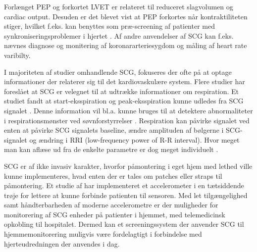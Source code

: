 Forlænget PEP og forkortet LVET er relateret til reduceret slagvolumen og cardiac output. Desuden er det blevet vist at PEP forkortes når kontraktiliteten stiger, hvilket f.eks. kan benyttes som præ-screening af patienter med synkroniseringsproblemer i hjertet  \cite{zanetti}  \cite{abra}. Af andre anvendelser af SCG kan f.eks. nævnes diagnose og monitering af koronararteriesygdom og måling af heart rate varibilty.

I majoriteten af studier omhandlende SCG, fokuseres der ofte på at optage informationer der relaterer sig til det kardiovaskulære system. Flere studier har foreslået at SCG er velegnet til at udtrække informationer om respiration. Et studiet fandt at start-eksspiration og peak-eksspiration kunne udledes fra SCG signalet \cite{pandia} \cite{magic}. Denne information vil  bl.a. kunne bruges til at detektere abnormaliteter i respirationsmønster ved søvnforstyrrelser \cite{tavaloka}. Respiration kan påvirke signalet ved enten at påvirke SCG signalets baseline, ændre amplituden af bølgerne i SCG-signalet og ændring i RRI (low-frequency power of R-R interval). Hvor meget man kan aflæse ud fra de enkelte parametre er dog meget individuelt \cite{magic}.

 SCG er af ikke invasiv karakter, hvorfor påmontering i eget hjem med lethed ville kunne implementeres, hvad enten der er tales om patches eller straps til påmontering. Et studie af \cite{Wearable} har implementeret et accelerometer i en tætsiddende trøje for lettere at kunne forbinde patienten til sensoren. Med let tilgængelighed samt håndterbarheden af moderne accelerometre  er der muligheder for monitorering af SCG enheder på patienter i hjemmet, med telemedicinsk opkobling til hospitalet. Dermed kan et screeningssystem der anvender SCG til hjemmemonitorering muligvis være fordelagtigt i forbindelse med hjerteudredningen der anvendes i dag.